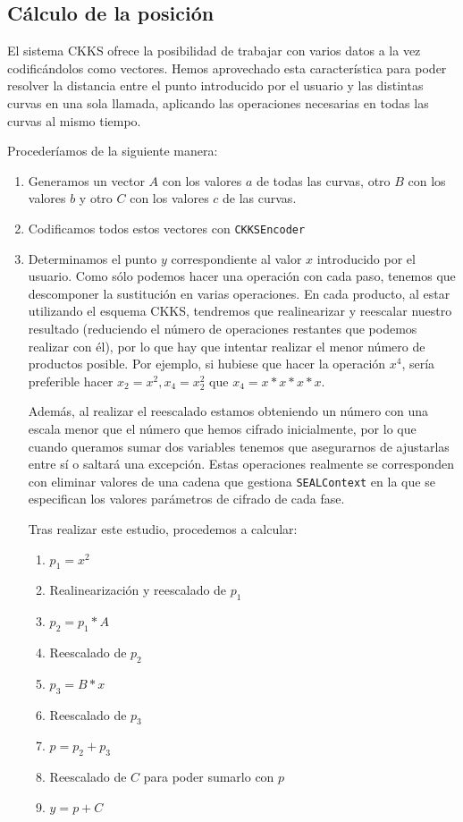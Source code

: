 \subsection{Cálculo de la posición}

El sistema CKKS ofrece la posibilidad de trabajar con varios datos a la vez codificándolos como vectores. Hemos aprovechado esta característica para poder resolver la distancia entre el punto introducido por el usuario y las distintas curvas en una sola llamada, aplicando las operaciones necesarias en todas las curvas al mismo tiempo.

Procederíamos de la siguiente manera:

\begin{enumerate}
    \item Generamos un vector $A$ con los valores $a$ de todas las curvas, otro $B$ con los valores $b$ y otro $C$ con los valores $c$ de las curvas.
    \item Codificamos todos estos vectores con \verb|CKKSEncoder|
    \item Determinamos el punto $y$ correspondiente al valor $x$ introducido por el usuario. Como sólo podemos hacer una operación con cada paso, tenemos que descomponer la sustitución en varias operaciones. En cada producto, al estar utilizando el esquema CKKS, tendremos que realinearizar y reescalar nuestro resultado (reduciendo el número de operaciones restantes que podemos realizar con él), por lo que hay que intentar realizar el menor número de productos posible. Por ejemplo, si hubiese que hacer la operación $x^4$, sería preferible hacer $x_2 = x^2, x_4 = x_2^2$ que $x_4 = x * x * x * x$. 
    
    Además, al realizar el reescalado estamos obteniendo un número con una escala menor que el número que hemos cifrado inicialmente, por lo que cuando queramos sumar dos variables tenemos que asegurarnos de ajustarlas entre sí o saltará una excepción. Estas operaciones realmente se corresponden con eliminar valores de una cadena que gestiona \verb|SEALContext| en la que se especifican los valores parámetros de cifrado de cada fase.
    
    
    Tras realizar este estudio, procedemos a calcular:
    \begin{enumerate}
        \item $p_1 = x^2$
        \item Realinearización y reescalado de $p_1$
        \item $p_2 = p_1 * A$
        \item Reescalado de $p_2$
        \item $p_3 = B*x$
        \item Reescalado de $p_3$
        \item $p = p_2 + p_3$
        \item Reescalado de $C$ para poder sumarlo con $p$
        \item $y = p + C$
    \end{enumerate}
    

\end{enumerate}
